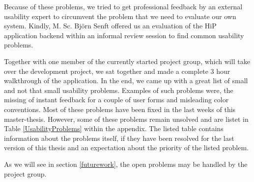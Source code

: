 Because of these problems, we tried to get professional feedback by an external usability expert to circumvent the problem that we need to evaluate our own system. Kindly, M. Sc. Bj\"orn Senft offered us an evaluation of the \ac{HiP} application backend within an informal review session to find common usability problems. 

Together with one member of the currently started project group, which will take over the development project, we sat together and made a complete 3 hour walkthrough of the application. In the end, we came up with a great list of small and not that small usability problems. Examples of such problems were, the missing of instant feedback for a couple of user forms and misleading color conventions. Most of these problems have been fixed in the last weeks of this master-thesis. However, some of these problems remain unsolved and are listet in Table \ref{UsabilityProblems} within the appendix. The listed table contains information about the problems itself, if they have been resolved for the last version of this thesis and an expectation about the priority of the listed problem. 

As we will see in section \ref{futurework}, the open problems may be handled by the project group.

